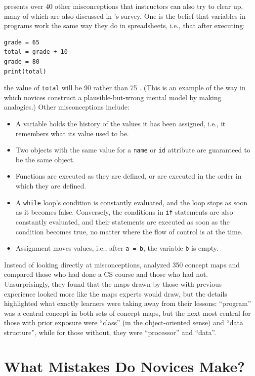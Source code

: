 \cite{Sorv2018} presents over 40 other misconceptions that
instructors can also try to clear up, many of which are also discussed
in \cite{Qian2017}'s survey. One is the belief that variables in
programs work the same way they do in spreadsheets, i.e., that after
executing:

\begin{verbatim}
grade = 65
total = grade + 10
grade = 80
print(total)
\end{verbatim}

the value of \texttt{total} will be 90 rather than 75 \cite{Kohn2017}.
(This is an example of the way in which novices construct a
plausible-but-wrong mental model by making analogies.) Other
misconceptions include:

\begin{itemize}
\item
  A variable holds the history of the values it has been assigned,
  i.e., it remembers what its value used to be.
\item
  Two objects with the same value for a \texttt{name} or \texttt{id} attribute are
  guaranteed to be the same object.
\item
  Functions are executed as they are defined, or are executed in the
  order in which they are defined.
\item
  A \texttt{while} loop's condition is constantly evaluated, and the loop
  stops as soon as it becomes false. Conversely, the conditions in
  \texttt{if} statements are also constantly evaluated, and their statements
  are executed as soon as the condition becomes true, no matter where
  the flow of control is at the time.
\item
  Assignment moves values, i.e., after \texttt{a\ =\ b}, the variable \texttt{b} is
  empty.
\end{itemize}

Instead of looking directly at misconceptions, \cite{Muhl2016}
analyzed 350 concept maps and compared those who had done a CS course
and those who had not. Unsurprisingly, they found that the maps drawn by
those with previous experience looked more like the maps experts would
draw, but the details highlighted what exactly learners were taking away
from their lessons: ``program'' was a central concept in both sets of
concept maps, but the next most central for those with prior exposure
were ``class'' (in the object-oriented sense) and ``data structure'', while
for those without, they were ``processor'' and ``data''.

\section{What Mistakes Do Novices Make?}\label{s:pck-mistakes}

